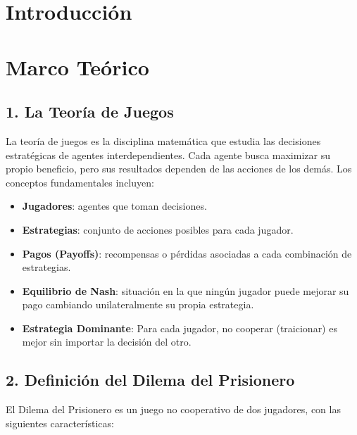 \documentclass{article}
\begin{document}


\section{Introducción}\label{sec:intr}


\section{Marco Teórico}\label{sec:marc}


\subsection{1. La Teoría de Juegos}
La teoría de juegos es la disciplina matemática que estudia las decisiones estratégicas de 
agentes interdependientes. Cada agente busca maximizar su propio beneficio, pero sus resultados 
dependen de las acciones de los demás. Los conceptos fundamentales incluyen:

\begin{itemize}
  \item \textbf{Jugadores}: agentes que toman decisiones.
  \item \textbf{Estrategias}: conjunto de acciones posibles para cada jugador.
  \item \textbf{Pagos (Payoffs)}: recompensas o pérdidas asociadas a cada combinación de 
    estrategias.
  \item \textbf{Equilibrio de Nash}: situación en la que ningún jugador puede mejorar 
    su pago cambiando unilateralmente su propia estrategia.
  \item \textbf{Estrategia Dominante}: Para cada jugador, no cooperar (traicionar) es mejor 
    sin importar la decisión del otro.
\end{itemize}

\subsection{2. Definición del Dilema del Prisionero}
El Dilema del Prisionero es un juego no cooperativo de dos jugadores, con las siguientes
características:
\end{document}
